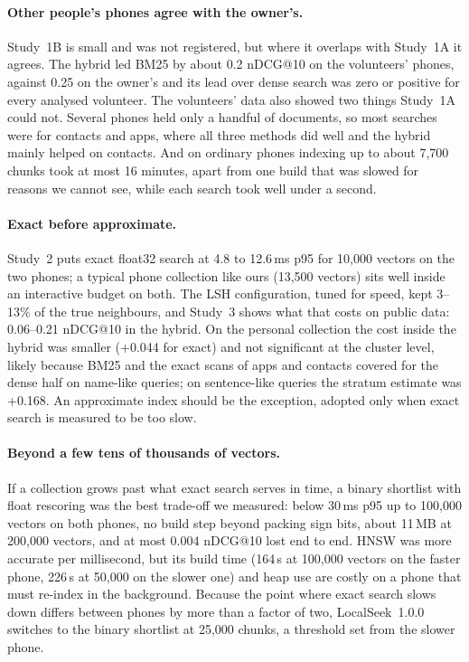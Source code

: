 \documentclass[pdflatex,sn-basic,Numbered]{sn-jnl}
\makeatletter
\newcommand{\ndcg}{nDCG@10}
\makeatother
\begin{document}
\paragraph{Other people's phones agree with the owner's.} Study~1B is small and was not registered, but where it overlaps with Study~1A it agrees. The hybrid led BM25 by about 0.2 \ndcg{} on the volunteers' phones, against 0.25 on the owner's and its lead over dense search was zero or positive for every analysed volunteer. The volunteers' data also showed two things Study~1A could not. Several phones held only a handful of documents, so most searches were for contacts and apps, where all three methods did well and the hybrid mainly helped on contacts. And on ordinary phones indexing up to about 7,700 chunks took at most 16 minutes, apart from one build that was slowed for reasons we cannot see, while each search took well under a second.

\paragraph{Exact before approximate.} Study~2 puts exact float32 search at 4.8 to 12.6\,ms p95 for 10,000 vectors on the two phones; a typical phone collection like ours (13,500 vectors) sits well inside an interactive budget on both. The LSH configuration, tuned for speed, kept 3--13\% of the true neighbours, and Study~3 shows what that costs on public data: 0.06--0.21 \ndcg{} in the hybrid. On the personal collection the cost inside the hybrid was smaller (+0.044 for exact) and not significant at the cluster level, likely because BM25 and the exact scans of apps and contacts covered for the dense half on name-like queries; on sentence-like queries the stratum estimate was +0.168. An approximate index should be the exception, adopted only when exact search is measured to be too slow.

\paragraph{Beyond a few tens of thousands of vectors.} If a collection grows past what exact search serves in time, a binary shortlist with float rescoring was the best trade-off we measured: below 30\,ms p95 up to 100,000 vectors on both phones, no build step beyond packing sign bits, about 11\,MB at 200,000 vectors, and at most 0.004 \ndcg{} lost end to end. HNSW was more accurate per millisecond, but its build time (164\,s at 100,000 vectors on the faster phone, 226\,s at 50,000 on the slower one) and heap use are costly on a phone that must re-index in the background. Because the point where exact search slows down differs between phones by more than a factor of two, LocalSeek~1.0.0 switches to the binary shortlist at 25,000 chunks, a threshold set from the slower phone.
\end{document}
